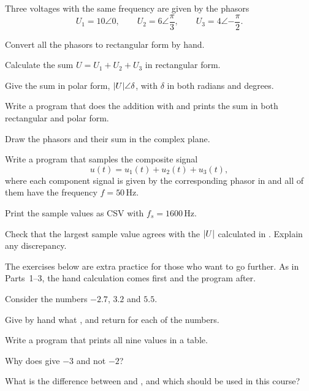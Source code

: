 Three voltages with the same frequency are given by the phasors
\[
  U_1 = 10\angle 0, \qquad U_2 = 6\angle\frac{\pi}{3}, \qquad U_3 = 4\angle{-\frac{\pi}{2}}.
\]
\begin{parts}
  \item Convert all the phasors to rectangular form by hand.
  \item Calculate the sum $U = U_1 + U_2 + U_3$ in rectangular form.
  \item Give the sum in polar form, $\lvert U\rvert\angle\delta$, with $\delta$ in both radians and
    degrees.
  \item Write a program that does the addition with  and prints the sum in both
    rectangular and polar form.
  \item Draw the phasors and their sum in the complex plane.
\end{parts}

\begin{parts}
  \item Write a program that samples the composite signal
    \[
      u(t) = u_1(t) + u_2(t) + u_3(t),
    \]
    where each component signal is given by the corresponding phasor in  and all of
    them have the frequency $f = 50\,\text{Hz}$.
  \item Print the sample values as CSV with $f_s = 1600\,\text{Hz}$.
  \item Check that the largest sample value agrees with the $\lvert U\rvert$ calculated in
    . Explain any discrepancy.
\end{parts}

The exercises below are extra practice for those who want to go further. As in
Parts~1--3, the hand calculation comes first and the program after.

Consider the numbers $-2.7$, $3.2$ and $5.5$.
\begin{parts}
  \item Give by hand what ,  and  return for each of the
    numbers.
  \item Write a program that prints all nine values in a table.
  \item Why does  give $-3$ and not $-2$?
  \item What is the difference between  and , and which should be used in
    this course?
\end{parts}

